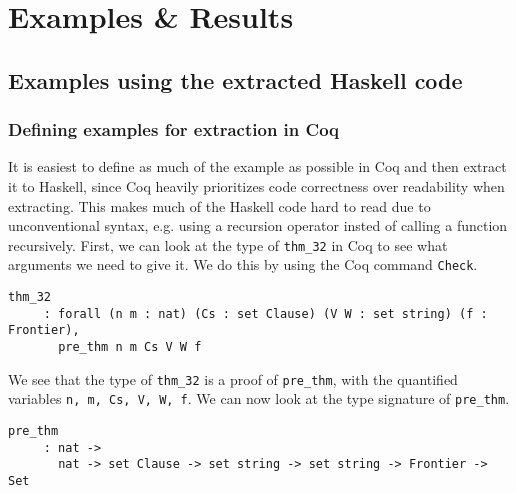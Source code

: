 \chapter{Examples \& Results}
\label{chap:examples_results}

\section{Examples using the extracted Haskell code}
\label{sec:examples}

\subsection{Defining examples for extraction in Coq}
\label{sec:defining_examples}

It is easiest to define as much of the example as possible in Coq and then extract it to Haskell,
since Coq heavily prioritizes code correctness over readability when extracting.
This makes much of the Haskell code hard to read due to unconventional syntax,
e.g. using a recursion operator insted of calling a function recursively.
First, we can look at the type of \lstinline{thm_32} in Coq to see what arguments we need to give it.
We do this by using the Coq command \lstinline{Check}.

\begin{minipage}{\linewidth}
\begin{lstlisting}[language=Coq, label={lst:thm_32_type_sig_coq}, caption={Type signature of \lstinline{thm_32} in Coq}]
thm_32
     : forall (n m : nat) (Cs : set Clause) (V W : set string) (f : Frontier),
       pre_thm n m Cs V W f
\end{lstlisting}
\end{minipage}

We see that the type of \lstinline{thm_32} is a proof of \lstinline{pre_thm}, with the quantified variables
\lstinline{n, m, Cs, V, W, f}.
We can now look at the type signature of \lstinline{pre_thm}.

\begin{minipage}{\linewidth}
\begin{lstlisting}[language=Coq, label={lst:pre_thm_type_sig_coq}, caption={Type signature of \lstinline{pre_thm} in Coq}]
pre_thm
     : nat ->
       nat -> set Clause -> set string -> set string -> Frontier -> Set
\end{lstlisting}
\end{minipage}

